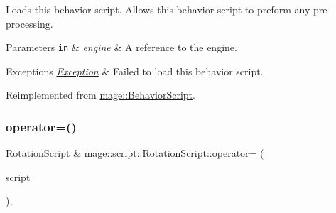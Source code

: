 Loads this behavior script. Allows this behavior script to preform any pre-\/processing.


\begin{DoxyParams}[1]{Parameters}
\mbox{\tt in}  & {\em engine} & A reference to the engine. \\
\hline
\end{DoxyParams}

\begin{DoxyExceptions}{Exceptions}
{\em \mbox{\hyperlink{classmage_1_1_exception}{Exception}}} & Failed to load this behavior script. \\
\hline
\end{DoxyExceptions}


Reimplemented from \mbox{\hyperlink{classmage_1_1_behavior_script_ae7864876b2ffb1d1d8d8a56e3099f1f2}{mage\+::\+Behavior\+Script}}.

\mbox{\label{classmage_1_1script_1_1_rotation_script_a9302878671d095bab0c31a379ad7d964}} 
\subsubsection{\texorpdfstring{operator=()}{operator=()}\hspace{0.1cm}{\footnotesize\ttfamily [1/2]}}
{\footnotesize\ttfamily \mbox{\hyperlink{classmage_1_1script_1_1_rotation_script}{Rotation\+Script}} \& mage\+::script\+::\+Rotation\+Script\+::operator= (\begin{DoxyParamCaption}\item[{const \mbox{\hyperlink{classmage_1_1script_1_1_rotation_script}{Rotation\+Script}} \&}]{script }\end{DoxyParamCaption})\hspace{0.3cm}{\ttfamily [default]}, {\ttfamily [noexcept]}}

\mbox{\label{classmage_1_1script_1_1_rotation_script_af75323393f7570b9fcee0cd62c4f76bd}} 
